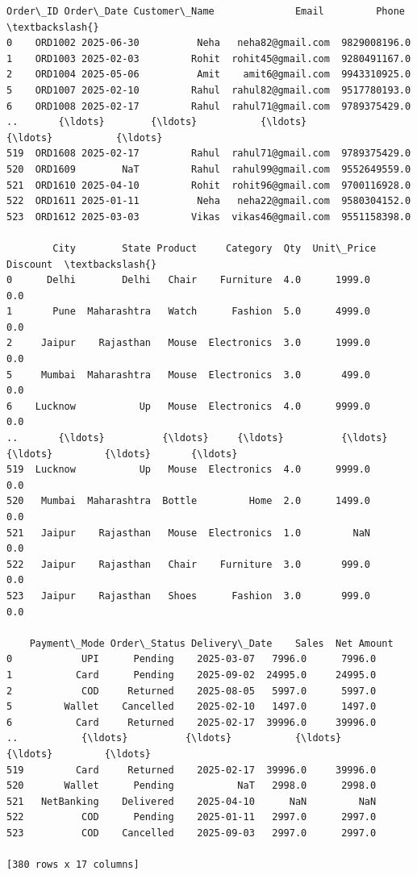 \documentclass[11pt]{article}
\makeatletter
\newcommand{\boxspacing}{\kern\kvtcb@left@rule\kern\kvtcb@boxsep}
\newcommand{\prompt}[4]{
        {\ttfamily\llap{{\color{#2}[#3]:\hspace{3pt}#4}}\vspace{-\baselineskip}}
    }
\makeatother
\begin{document}
            \begin{tcolorbox}[breakable, size=fbox, boxrule=.5pt, pad at break*=1mm, opacityfill=0]
\prompt{Out}{outcolor}{39}{\boxspacing}
\begin{Verbatim}[commandchars=\\\{\}]
    Order\_ID Order\_Date Customer\_Name              Email         Phone  \textbackslash{}
0    ORD1002 2025-06-30          Neha   neha82@gmail.com  9829008196.0
1    ORD1003 2025-02-03         Rohit  rohit45@gmail.com  9280491167.0
2    ORD1004 2025-05-06          Amit    amit6@gmail.com  9943310925.0
5    ORD1007 2025-02-10         Rahul  rahul82@gmail.com  9517780193.0
6    ORD1008 2025-02-17         Rahul  rahul71@gmail.com  9789375429.0
..       {\ldots}        {\ldots}           {\ldots}                {\ldots}           {\ldots}
519  ORD1608 2025-02-17         Rahul  rahul71@gmail.com  9789375429.0
520  ORD1609        NaT         Rahul  rahul99@gmail.com  9552649559.0
521  ORD1610 2025-04-10         Rohit  rohit96@gmail.com  9700116928.0
522  ORD1611 2025-01-11          Neha   neha22@gmail.com  9580304152.0
523  ORD1612 2025-03-03         Vikas  vikas46@gmail.com  9551158398.0

        City        State Product     Category  Qty  Unit\_Price  Discount  \textbackslash{}
0      Delhi        Delhi   Chair    Furniture  4.0      1999.0       0.0
1       Pune  Maharashtra   Watch      Fashion  5.0      4999.0       0.0
2     Jaipur    Rajasthan   Mouse  Electronics  3.0      1999.0       0.0
5     Mumbai  Maharashtra   Mouse  Electronics  3.0       499.0       0.0
6    Lucknow           Up   Mouse  Electronics  4.0      9999.0       0.0
..       {\ldots}          {\ldots}     {\ldots}          {\ldots}  {\ldots}         {\ldots}       {\ldots}
519  Lucknow           Up   Mouse  Electronics  4.0      9999.0       0.0
520   Mumbai  Maharashtra  Bottle         Home  2.0      1499.0       0.0
521   Jaipur    Rajasthan   Mouse  Electronics  1.0         NaN       0.0
522   Jaipur    Rajasthan   Chair    Furniture  3.0       999.0       0.0
523   Jaipur    Rajasthan   Shoes      Fashion  3.0       999.0       0.0

    Payment\_Mode Order\_Status Delivery\_Date    Sales  Net Amount
0            UPI      Pending    2025-03-07   7996.0      7996.0
1           Card      Pending    2025-09-02  24995.0     24995.0
2            COD     Returned    2025-08-05   5997.0      5997.0
5         Wallet    Cancelled    2025-02-10   1497.0      1497.0
6           Card     Returned    2025-02-17  39996.0     39996.0
..           {\ldots}          {\ldots}           {\ldots}      {\ldots}         {\ldots}
519         Card     Returned    2025-02-17  39996.0     39996.0
520       Wallet      Pending           NaT   2998.0      2998.0
521   NetBanking    Delivered    2025-04-10      NaN         NaN
522          COD      Pending    2025-01-11   2997.0      2997.0
523          COD    Cancelled    2025-09-03   2997.0      2997.0

[380 rows x 17 columns]
\end{Verbatim}
\end{tcolorbox}
        
\end{document}

